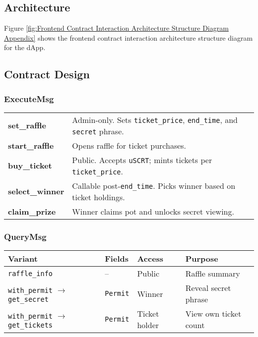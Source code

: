 \documentclass{article}
\begin{document}
\subsection{Architecture}
Figure \ref{fig:Frontend Contract Interaction Architecture Structure Diagram Appendix} shows the frontend contract interaction architecture structure diagram for the dApp.

\subsection{Contract Design}

\subsubsection{ExecuteMsg}
\begin{tabular}{@{}lp{9cm}@{}}
  \textbf{set\_raffle} & Admin-only. Sets \texttt{ticket\_price}, \texttt{end\_time}, and \texttt{secret} phrase. \\
  \textbf{start\_raffle} & Opens raffle for ticket purchases. \\
  \textbf{buy\_ticket} & Public. Accepts \texttt{uSCRT}; mints tickets per \texttt{ticket\_price}. \\
  \textbf{select\_winner} & Callable post-\texttt{end\_time}. Picks winner based on ticket holdings. \\
  \textbf{claim\_prize} & Winner claims pot and unlocks secret viewing. \\
\end{tabular}

\subsubsection{QueryMsg}
\begin{center}
\begin{tabular}{@{}llll@{}}
\toprule
Variant & Fields & Access & Purpose \\
\midrule
\texttt{raffle\_info} & -- & Public & Raffle summary \\
\texttt{with\_permit} $\rightarrow$ \texttt{get\_secret} & \texttt{Permit} & Winner & Reveal secret phrase \\
\texttt{with\_permit} $\rightarrow$ \texttt{get\_tickets} & \texttt{Permit} & Ticket holder & View own ticket count \\
\bottomrule
\end{tabular}
\end{center}
\end{document}
